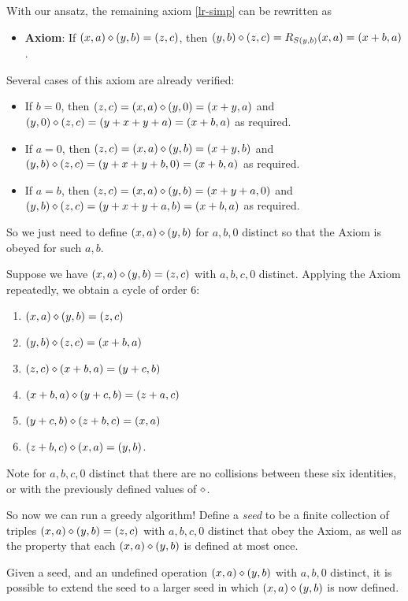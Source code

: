 With our ansatz, the remaining axiom \eqref{lr-simp} can be rewritten as

\begin{itemize}
\item {\bf Axiom}: If $(x,a) \diamond (y,b) = (z,c)$, then $(y,b) \diamond (z,c) = R_{S(y,b)} (x,a) = (x+b,a)$.
\end{itemize}

Several cases of this axiom are already verified:
\begin{itemize}
\item If $b=0$, then $(z,c) = (x,a) \diamond (y,0) = (x+y,a)$ and $(y,0) \diamond (z,c) = (y+x+y+a) = (x+b,a)$ as required.
\item If $a=0$, then $(z,c) = (x,a) \diamond (y,b) = (x+y,b)$ and $(y,b) \diamond (z,c) = (y+x+y+b,0) = (x+b,a)$ as required.
\item If $a=b$, then $(z,c) = (x,a) \diamond (y,b) = (x+y+a,0)$ and $(y,b) \diamond (z,c) = (y+x+y+a,b) = (x+b,a)$ as required.
\end{itemize}

So we just need to define $(x,a) \diamond (y,b)$ for $a,b,0$ distinct so that the Axiom is obeyed for such $a,b$.

Suppose we have $(x,a) \diamond (y,b) = (z,c)$ with $a,b,c,0$ distinct.  Applying the Axiom repeatedly, we obtain a cycle of order $6$:
\begin{enumerate}
  \item $(x,a) \diamond (y,b) = (z,c)$
  \item $ (y,b) \diamond (z,c) = (x+b,a)$
  \item $ (z,c) \diamond (x+b,a) = (y+c,b)$
  \item $ (x+b,a) \diamond (y+c,b) = (z+a,c)$
  \item $ (y+c,b) \diamond (z+b,c) = (x,a)$
  \item $ (z+b,c) \diamond (x,a) = (y,b)$.
\end{enumerate}

Note for $a,b,c,0$ distinct that there are no collisions between these six identities, or with the previously defined values of $\diamond$.

So now we can run a greedy algorithm!  Define a \emph{seed} to be a finite collection of triples $(x,a) \diamond (y,b) = (z,c)$ with $a,b,c,0$ distinct that obey the Axiom, as well as the property that each $(x,a) \diamond (y,b)$ is defined at most once.

\begin{proposition}\label{enlarge-1323-seed}  Given a seed, and an undefined operation $(x,a) \diamond (y,b)$ with $a,b,0$ distinct, it is possible to extend the seed to a larger seed in which $(x,a) \diamond (y,b)$ is now defined.
\end{proposition}

